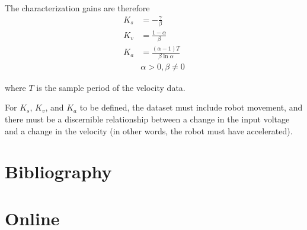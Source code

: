 \documentclass[10pt,conference,compsoc]{IEEEtran}
\begin{document}
The characterization gains are therefore
\begin{align}
  K_s &= -\frac{\gamma}{\beta} \\
  K_v &= \frac{1 - \alpha}{\beta} \\
  K_a &= \frac{(\alpha - 1) T}{\beta \ln\alpha} \\
      &\alpha > 0, \beta \neq 0 \nonumber
\end{align}

where $T$ is the sample period of the velocity data.

For $K_s$, $K_v$, and $K_a$ to be defined, the dataset must include robot
movement, and there must be a discernible relationship between a change in the
input voltage and a change in the velocity (in other words, the robot must have
accelerated).

\section{Bibliography}

\section*{Online}
\printbibliography[heading=bibempty,type=online]
\end{document}
